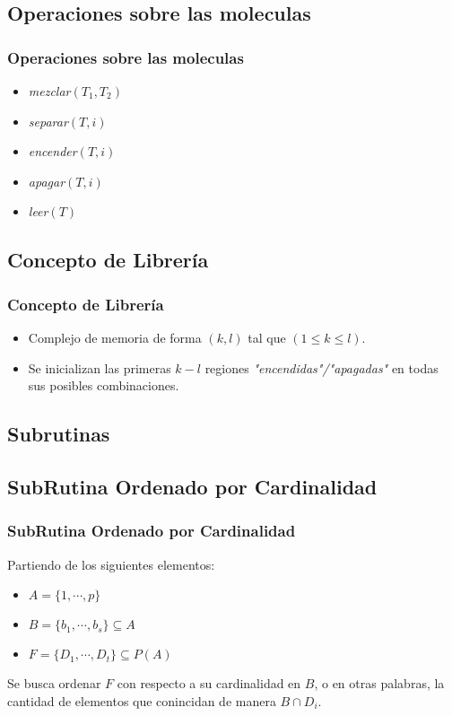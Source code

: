 \documentclass[12pt]{beamer}
\begin{document}
 \begin{frame}
     \subsection{Operaciones sobre las moleculas}
     \frametitle{Operaciones sobre las moleculas}
     \begin{itemize}
        \item \emph{mezclar}$(T_1,T_2)$
        \item \emph{separar}$(T, i)$
        \item \emph{encender}$(T, i)$
        \item \emph{apagar}$(T, i)$
        \item \emph{leer}$(T)$
     \end{itemize}
 \end{frame}
 \begin{frame}
     \subsection{Concepto de Librería}
     \frametitle{Concepto de Librería}
     \begin{itemize}
         \item Complejo de memoria de forma $(k,l)$ tal que  $(1 \leq k \leq l)$.
         \item Se inicializan las primeras $k - l$ regiones \emph{"encendidas"/"apagadas"} en todas sus posibles combinaciones.
     \end{itemize}
 \end{frame}
 \begin{frame}
     \section{Subrutinas}
     \subsection{SubRutina Ordenado por Cardinalidad}
     \frametitle{SubRutina Ordenado por Cardinalidad}
     Partiendo de los siguientes elementos:
     \begin{itemize}
        \item $A = \{1,\cdots,p\}$
        \item $B = \{b_1,\cdots,b_s\} \subseteq A$ 
        \item $F = \{D_1,\cdots,D_t\} \subseteq P(A)$ 
    \end{itemize}
    Se busca ordenar $F$ con respecto a su cardinalidad en $B$, o en otras palabras, la cantidad de elementos que conincidan de manera $B\cap D_i$.
 \end{frame}
\end{document}
